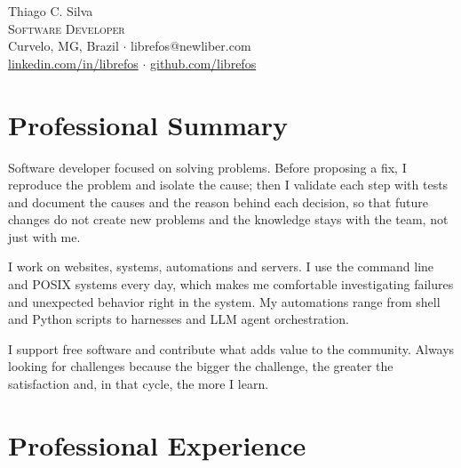 \documentclass[a4paper,11pt]{article}
\newcommand{\phone}{}
\begin{document}

\begin{center}
  {\Huge Thiago C. Silva} \\
  \vspace*{0.2cm}
  {\scshape Software Developer} \\
  {Curvelo, MG, Brazil $\cdot$ librefos@newliber.com\phone} \\
  {\href{https://linkedin.com/in/librefos}{linkedin.com/in/librefos} $\cdot$
  \href{https://github.com/librefos}{github.com/librefos}}
\end{center}


\section{Professional Summary}
{\setlength{\parindent}{0pt}\setlength{\parskip}{0.5\baselineskip}
Software developer focused on solving problems.  Before proposing a fix, I
reproduce the problem and isolate the cause; then I validate each step with
tests and document the causes and the reason behind each decision, so that
future changes do not create new problems and the knowledge stays with the
team, not just with me.

I work on websites, systems, automations and servers.  I use the command line
and POSIX systems every day, which makes me comfortable investigating failures
and unexpected behavior right in the system.  My automations range from shell
and Python scripts to harnesses and LLM agent orchestration.

I support free software and contribute what adds value to the community.
Always looking for challenges because the bigger the challenge, the greater the
satisfaction and, in that cycle, the more I learn.\par}


\section{Professional Experience}
\end{document}

